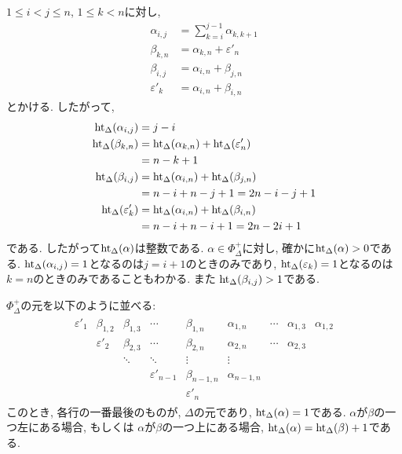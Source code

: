 $1\leq i<j\leq n$, $1\leq k <n$に対し,
\begin{align*}
\alpha_{i,j}&=\sum_{k=i}^{j-1}\alpha_{k,k+1}\\
\beta_{k,n}&=\alpha_{k,n}+\varepsilon'_{n}\\
\beta_{i,j}&=\alpha_{i,n}+\beta_{j,n}\\
\varepsilon'_{k}&=\alpha_{i,n}+\beta_{i,n}
\end{align*}
とかける.
したがって,
\begin{align*}
\operatorname{ht}_\Delta(\alpha_{i,j})&=j-i\\
\operatorname{ht}_\Delta(\beta_{k,n})&=\operatorname{ht}_\Delta(\alpha_{k,n})+\operatorname{ht}_\Delta(\varepsilon'_{n})\\
&=n-k+1\\
\operatorname{ht}_\Delta(\beta_{i,j})&=\operatorname{ht}_\Delta(\alpha_{i,n})+\operatorname{ht}_\Delta(\beta_{j,n})\\
&=n-i+n-j+1=2n-i-j+1\\
\operatorname{ht}_\Delta(\varepsilon'_{k})&=\operatorname{ht}_\Delta(\alpha_{i,n})+\operatorname{ht}_\Delta(\beta_{i,n})\\
&=n-i+n-i+1=2n-2i+1
\end{align*}
である.
したがって$\operatorname{ht}_\Delta(\alpha)$は整数である.
$\alpha\in\Phi_\Delta^+$に対し, 確かに$\operatorname{ht}_{\Delta}(\alpha)>0$である.
$\operatorname{ht}_\Delta(\alpha_{i,j})=1$となるのは$j=i+1$のときのみであり,
$\operatorname{ht}_\Delta(\varepsilon_{k})=1$となるのは$k=n$のときのみであることもわかる.
また
$\operatorname{ht}_\Delta(\beta_{i,j})>1$である.

$\Phi_\Delta^+$の元を以下のように並べる:
\begin{align*}
  \begin{array}{ccccccccc}
    \varepsilon'_{1}&\beta_{1,2}&\beta_{1,3}&\cdots&\beta_{1,n}&
    \alpha_{1,n}&\cdots&\alpha_{1,3}&\alpha_{1,2}\\
    &\varepsilon'_{2}&\beta_{2,3}&\cdots&\beta_{2,n}&
    \alpha_{2,n}&\cdots&\alpha_{2,3}\\
    &&\ddots&\ddots&
    \vdots      &\vdots&&\\
    &&&\varepsilon'_{n-1}&\beta_{n-1,n}&\alpha_{n-1,n}\\
    &&&&\varepsilon'_{n}
  \end{array}
\end{align*}
このとき, 各行の一番最後のものが, $\Delta$の元であり,
$\operatorname{ht}_\Delta(\alpha)=1$である.
$\alpha$が$\beta$の一つ左にある場合,
もしくは
$\alpha$が$\beta$の一つ上にある場合,
$\operatorname{ht}_\Delta(\alpha)=\operatorname{ht}_\Delta(\beta)+1$である.

